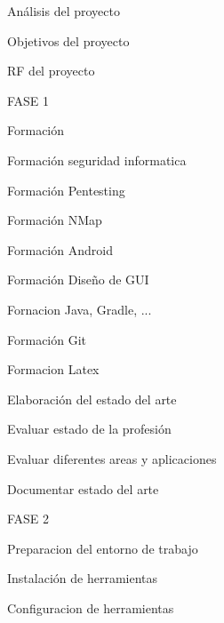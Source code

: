 \begin{numbered}
	\setcounter{numberedi}{-1} %
	
	\item Análisis del proyecto
	\begin{numbered}
		\item Objetivos del proyecto
		\item RF del proyecto
	\end{numbered}
	
	\item FASE 1
	\begin{numbered}
		
		\item Formación
		\begin{numbered}
			\item Formación seguridad informatica
			\item Formación Pentesting
			\begin{numbered}
				\item Formación NMap
			\end{numbered}
			\item Formación Android
			\begin{numbered}
				\item Formación Diseño de GUI
				\item Fornacion Java, Gradle, ...
			\end{numbered}
			\item Formación Git
			\item Formacion Latex
		\end{numbered}
		
		\item Elaboración del estado del arte
		\begin{numbered}
			\item Evaluar estado de la profesión
			\item Evaluar diferentes areas y aplicaciones
			\item Documentar estado del arte
		\end{numbered}
	\end{numbered}
	
	\item FASE 2
	\begin{numbered}
		\item Preparacion del entorno de trabajo
		\begin{numbered}
			\item Instalación de herramientas
			\item Configuracion de herramientas
		\end{numbered}
		

\end{numbered}
\end{numbered}
